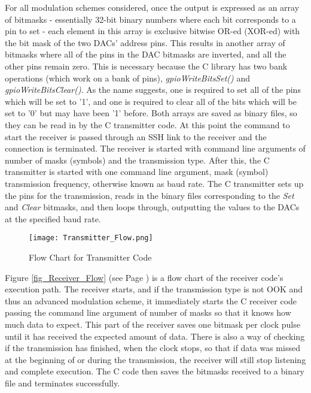 \documentclass[../main.tex]{subfiles}
\begin{document}
For all modulation schemes considered, once the output is expressed as an array of bitmasks - essentially 32-bit binary numbers where each bit corresponds to a pin to set - each element in this array is exclusive bitwise OR-ed (XOR-ed) with the bit mask of the two DACs' address pins.
This results in another array of bitmasks where all of the pins in the DAC bitmasks are inverted, and all the other pins remain zero.
This is necessary because the C library has two bank operations (which work on a bank of pins), \textit{gpioWrite\textunderscore Bits\textunderscore Set()} and \textit{gpioWrite\textunderscore Bits\textunderscore Clear()}.
As the name suggests, one is required to set all of the pins which will be set to '1', and one is required to clear all of the bits which will be set to '0' but may have been '1' before.
Both arrays are saved as binary files, so they can be read in by the C transmitter code.
At this point the command to start the receiver is passed through an SSH link to the receiver and the connection is terminated.
The receiver is started with command line arguments of number of masks (symbols) and the transmission type.
After this, the C transmitter is started with one command line argument, mask (symbol) transmission frequency, otherwise known as baud rate.
The C transmitter sets up the pins for the transmission, reads in the binary files corresponding to the \textit{Set} and \textit{Clear} bitmasks, and then loops through, outputting the values to the DACs at the specified baud rate.\\

\begin{figure}[ht]
	\centering
	\texttt{[image: Transmitter\_Flow.png]}
	\caption{Flow Chart for Transmitter Code}
	\label{fig_Transmitter_Flow}
\end{figure}


\clearpage

Figure \ref{fig_Receiver_Flow} (see Page \pageref{fig_Receiver_Flow}) is a flow chart of the receiver code's execution path.
The receiver starts, and if the transmission type is not OOK and thus an advanced modulation scheme, it immediately starts the C receiver code passing the command line argument of number of masks so that it knows how much data to expect.
This part of the receiver saves one bitmask per clock pulse until it has received the expected amount of data.
There is also a way of checking if the transmission has finished, when the clock stops, so that if data was missed at the beginning of or during the transmission, the receiver will still stop listening and complete execution.
The C code then saves the bitmasks received to a binary file and terminates successfully.\\
\end{document}

